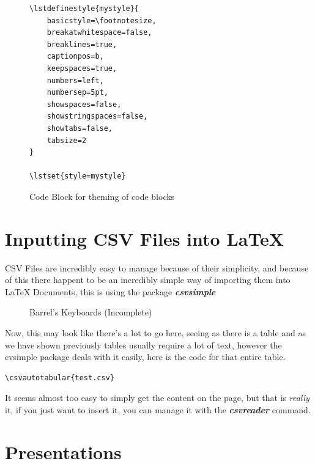 \documentclass[12pt, letterpaper, oneside]{article} \usepackage[utf8]{inputenc}
\begin{document}
\begin{figure}[H]
	\centering
	\begin{lstlisting}
\lstdefinestyle{mystyle}{
    basicstyle=\footnotesize,
    breakatwhitespace=false,         
    breaklines=true,                 
    captionpos=b,                    
    keepspaces=true,                 
    numbers=left,                    
    numbersep=5pt,                  
    showspaces=false,                
    showstringspaces=false,
    showtabs=false,                  
    tabsize=2
}
 
\lstset{style=mystyle}
	\end{lstlisting}
	\caption{Code Block for theming of code blocks}
\end{figure}

\pagebreak

\section{Inputting CSV Files into \LaTeX{}}

CSV Files are incredibly easy to manage because of their simplicity, and because of this there happent to be an incredibly simple way of importing them into \LaTeX{} Documents, this is using the package \textbf{\emph{csvsimple}}

\begin{figure}[H]
\caption{Barrel's Keyboards (Incomplete)}
\end{figure}

Now, this may look like there's a lot to go here, seeing as there is a table and as we have shown previously tables usually require a lot of text, however the cvsimple package deals with it easily, here is the code for that entire table.

\begin{lstlisting}
\csvautotabular{test.csv}
\end{lstlisting}

It seems almost too easy to simply get the content on the page, but that is \emph{really} it, if you just want to insert it, you can manage it with the \textbf{\emph{csvreader}} command. 

\section{Presentations}
\end{document}
